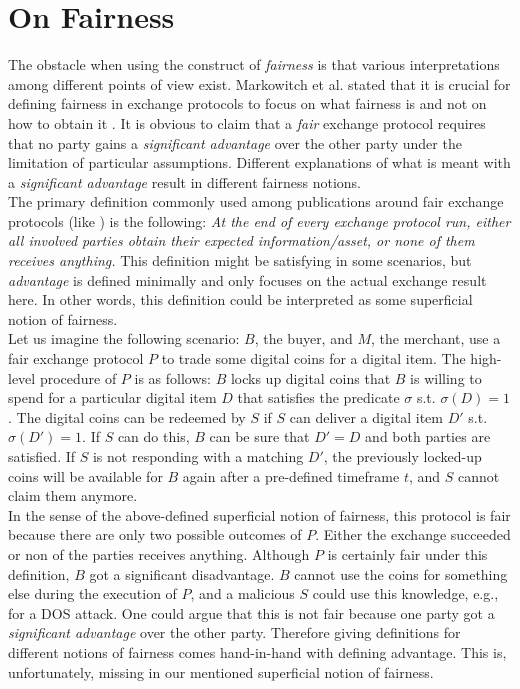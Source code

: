\documentclass{cacthesis}
\begin{document}
		\section{On Fairness}
		The obstacle when using the construct of \textit{fairness} is that various interpretations among different points of view exist. Markowitch et al. stated that it is crucial for defining fairness in exchange protocols to focus on what fairness is and not on how to obtain it \cite{10.1007/3-540-36552-4_31}. It is obvious to claim that a \textit{fair} exchange protocol requires that no party gains a \textit{significant advantage} over the other party under the limitation of particular assumptions. Different explanations of what is meant with a \textit{significant advantage} result in different fairness notions. \\
        The primary definition commonly used among publications around fair exchange protocols (like \cite{10.1145/266420.266426} \cite{asyncOptiFairEx1998} \cite{remarksOnFairEx2000})  is the following: \textit{At the end of every exchange protocol run, either all involved parties obtain their expected information/asset, or none of them receives anything.} This definition might be satisfying in some scenarios, but \textit{advantage} is defined minimally and only focuses on the actual exchange result here. In other words, this definition could be interpreted as some superficial notion of fairness. \\
        Let us imagine the following scenario: $B$, the buyer, and $M$, the merchant, use a fair exchange protocol $P$ to trade some digital coins for a digital item. The high-level procedure of $P$ is as follows: $B$ locks up digital coins that $B$ is willing to spend for a particular digital item $D$ that satisfies the predicate $\sigma$ s.t. $\sigma\left( D\right) =1$. The digital coins can be redeemed by $S$ if $S$ can deliver a digital item $D'$ s.t. $\sigma\left( D'\right) =1$. If $S$ can do this, $B$ can be sure that $D' = D$ and both parties are satisfied. If $S$ is not responding with a matching $D'$, the previously locked-up coins will be available for $B$ again after a pre-defined timeframe $t$, and $S$ cannot claim them anymore. \\
        In the sense of the above-defined superficial notion of fairness, this protocol is fair because there are only two possible outcomes of $P$. Either the exchange succeeded or non of the parties receives anything. 
        Although $P$ is certainly fair under this definition, $B$ got a significant disadvantage. $B$ cannot use the coins for something else during the execution of $P$, and a malicious $S$ could use this knowledge, e.g., for a DOS attack. One could argue that this is not fair because one party got a \textit{significant advantage} over the other party. Therefore giving definitions for different notions of fairness comes hand-in-hand with defining advantage. This is, unfortunately, missing in our mentioned superficial notion of fairness. 
        
\end{document}
